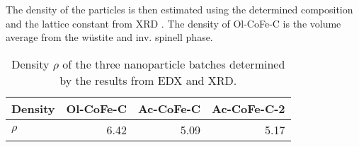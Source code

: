 \documentclass[\main/dresen_thesis.tex]{subfiles}
\begin{document}
  The density of the particles is then estimated using the determined composition and the lattice constant from XRD .
  The density of Ol-CoFe-C is the volume average from the w\"ustite and inv. spinell phase.

  \begin{table}[ht]
    \centering
    \caption{\label{tab:monolayers:nanoparticles:edx}Density $\rho$ of the three nanoparticle batches determined by the results from EDX and XRD.}
    \begin{tabular}{ l | r | r | r }
       Density               & \textbf{Ol-CoFe-C} & \textbf{Ac-CoFe-C} & \textbf{Ac-CoFe-C-2}\\
      \hline
      \rule{0pt}{2ex} $\rho$ & 6.42               & 5.09               & 5.17\\
      \hline
    \end{tabular}
  \end{table}
\end{document}
